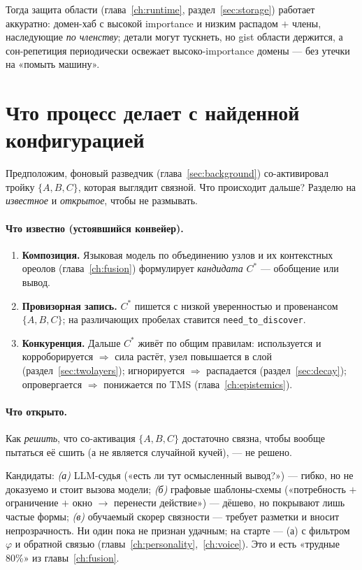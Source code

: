 Тогда защита области (глава~\ref{ch:runtime}, раздел~\ref{sec:storage}) работает
аккуратно: домен-хаб с высокой importance и низким распадом $+$ члены, наследующие
\emph{по членству}; детали могут тускнеть, но gist области держится, а сон-репетиция
периодически освежает высоко-importance домены — без утечки на «помыть машину».

\section{Что процесс делает с найденной конфигурацией}
\label{sec:whatfusiondoes}

Предположим, фоновый разведчик (глава~\ref{sec:background}) со-активировал тройку
$\{A,B,C\}$, которая выглядит связной. Что происходит дальше? Разделю на
\emph{известное} и \emph{открытое}, чтобы не размывать.

\paragraph{Что известно (устоявшийся конвейер).}
\begin{enumerate}\itemsep1pt
\item \textbf{Композиция.} Языковая модель по объединению узлов и их контекстных
ореолов (глава~\ref{ch:fusion}) формулирует \emph{кандидата} $C^\ast$ — обобщение
или вывод.
\item \textbf{Провизорная запись.} $C^\ast$ пишется с низкой уверенностью и
провенансом $\{A,B,C\}$; на различающих пробелах ставится \texttt{need\_to\_discover}.
\item \textbf{Конкуренция.} Дальше $C^\ast$ живёт по общим правилам: используется и
корроборируется $\Rightarrow$ сила растёт, узел повышается в слой
(раздел~\ref{sec:twolayers}); игнорируется $\Rightarrow$ распадается
(раздел~\ref{sec:decay}); опровергается $\Rightarrow$ понижается по TMS
(глава~\ref{ch:epistemics}).
\end{enumerate}

\paragraph{Что открыто.} Как \emph{решить}, что со-активация $\{A,B,C\}$ достаточно
связна, чтобы вообще пытаться её сшить (а не является случайной кучей), — не решено.

\begin{openq}
Кандидаты: \emph{(а)} LLM-судья («есть ли тут осмысленный вывод?») — гибко, но не
доказуемо и стоит вызова модели; \emph{(б)} графовые шаблоны-схемы («потребность $+$
ограничение $+$ окно $\to$ перенести действие») — дёшево, но покрывают лишь частые
формы; \emph{(в)} обучаемый скорер связности — требует разметки и вносит
непрозрачность. Ни один пока не признан удачным; на старте — (а) с фильтром $\varphi$
и обратной связью (главы~\ref{ch:personality},~\ref{ch:voice}). Это и есть «трудные
80\%» из главы~\ref{ch:fusion}.
\end{openq}

